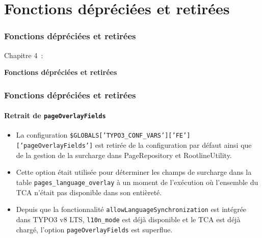 %

\section{Fonctions dépréciées et retirées}
\begin{frame}[fragile]
	\frametitle{Fonctions dépréciées et retirées}

	\begin{center}\huge{Chapitre 4~:}\end{center}
	\begin{center}\huge{\color{typo3darkgrey}\textbf{Fonctions dépréciées et retirées}}\end{center}

\end{frame}


\begin{frame}[fragile]
	\frametitle{Fonctions dépréciées et retirées}
	\framesubtitle{Retrait de \texttt{pageOverlayFields}}

	\begin{itemize}
		\item La configuration \texttt{\$GLOBALS['TYPO3\_CONF\_VARS']['FE']['pageOverlayFields']}
			est retirée de la configuration par défaut ainsi que de la gestion de la surcharge dans
			PageRepository et RootlineUtility.

		\item Cette option était utilisée pour déterminer les champs de surcharge dans la table
			\texttt{pages\_language\_overlay} à un moment de l'exécution où l'ensemble du TCA
			n'était pas disponible dans son entièreté.

		\item Depuis que la fonctionnalité \texttt{allowLanguageSynchronization} est intégrée dans
			TYPO3 v8 LTS, \texttt{l10n\_mode} est déjà disponible et le TCA est déjà chargé, l'option
			\texttt{pageOverlayFields} est superflue.

	\end{itemize}

\end{frame}

